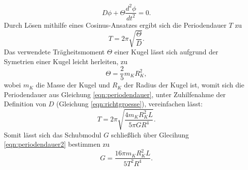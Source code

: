     \begin{equation}
    \label{eqn:diffgleichung}
    D \phi + \Theta \frac{d^2\phi}{dt^2} = 0 .
    \end{equation}
    Durch Lösen mithilfe eines Cosinus-Ansatzes ergibt sich die Periodendauer $T$ zu
    \begin{equation}
    \label{eqn:periodendauer}
    T = 2 \pi \sqrt{\frac{\Theta}{D}}. 
    \end{equation}
    Das verwendete Trägheitsmoment $\Theta$ einer Kugel lässt sich aufgrund der Symetrien einer Kugel leicht herleiten, zu
    \begin{equation}
    \label{eqn:traegheit}
    \Theta = \frac {2}{5} m_K R_K^{2},
    \end{equation}
    wobei $m_K$ die Masse der Kugel und $R_K$ der Radius der Kugel ist,
    womit sich die Periodendauer aus Gleichung \eqref{eqn:periodendauer}, unter Zuhilfenahme der Definition von $D$ (Gleichung \eqref{eqn:richtgroesse}), vereinfachen lässt:
    \begin{equation}
    \label{eqn:periodendauer2}
    T = 2 \pi \sqrt{\frac{4 m_K R_K^{2} L}{5 \pi G R^4 }}.
    \end{equation}
    Somit lässt sich das Schubmodul $G$ schließlich über Glecihung \eqref{eqn:periodendauer2} bestimmen zu
    \begin{equation}
    \label{eqn:schubmodul}
    G = \frac{16 \pi m_K R_K^{2} L}{5 T^2 R^4}.
    \end{equation}

